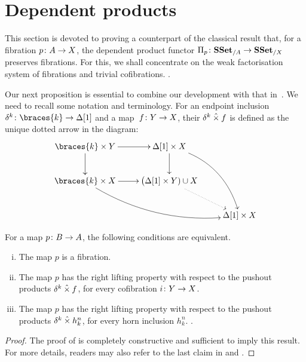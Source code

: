 \documentclass[reqno,10pt,a4paper,oneside,draft]{amsart}
\begin{document}
\section{Dependent products}
\label{sec:Pi-types}



This section is devoted to proving a counterpart of the classical result that, for a fibration $p \colon A \rightarrow X$, the dependent product functor $\Pi_p \colon \mathbf{SSet}_{/A} \to \mathbf{SSet}_{/X}$ preserves fibrations. For this, we 
shall concentrate on the weak factorisation system of fibrations and trivial cofibrations. 
.  

\medskip

Our next proposition is essential to combine our development with that in~\cite{gambino2017frobenius}.
We need to recall some notation and terminology. For an endpoint inclusion $\kcyl \co \braces{ k } \to \Delta[1]$ and a map~$f \colon Y \to X$, their $\delta^k \mathbin{\hat{\times}} f$ is defined as the unique dotted arrow  in the diagram:
\[
\xymatrix{
\braces{ k } \times Y \ar[r] \ar[d] &  \Delta[1]  \times X  \ar[d] \ar@/^1.5pc/[ddr] \\
\braces{ k} \times X \ar[r]  \ar@/_1.5pc/[drr] & \big( \Delta[1] \times Y ) \cup X \ar@{.>}[dr]  \\
 & &\Delta[1] \times  X }
 \]



\begin{proposition} For a map $p \colon B \to A$, the following conditions are equivalent.
\begin{enumerate}[(i)] 
\item The map $p$ is a fibration.
\item The map $p$ has the right lifting property with respect to the pushout products $ \delta^k  \mathbin{\hat{\times}} f$, for every cofibration $i \colon Y \to X$.
\item The map $p$ has the right lifting property with respect to the pushout products $ \delta^k  \mathbin{\hat{\times}} h^n_k$, for every  
horn inclusion $h^n_k$. .
\end{enumerate}
\end{proposition} 

\begin{proof}The proof of \cite[Theorem~3.2.3]{joyal-tierney:simplicial-homotopy-theory} is completely constructive and sufficient to imply this result.
For more details, readers may also refer to the last claim in \cite[Corollary~5.3.2]{henry2018wms}
and \cite[Proposition~5.2.6]{henry2018wms}.
\end{proof}
\end{document}
